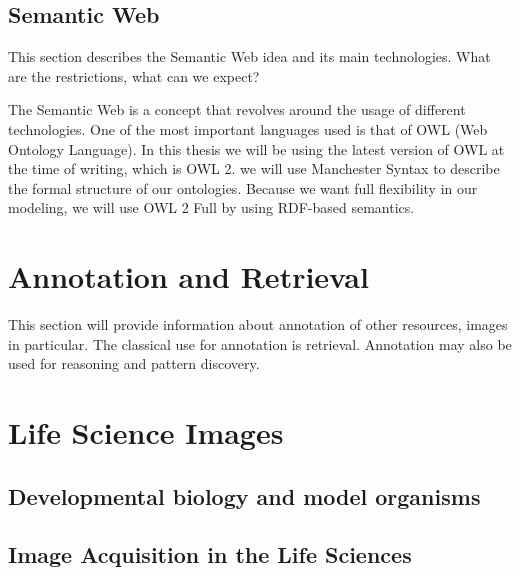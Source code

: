 
\subsection{Semantic Web}

This section describes the Semantic Web idea and
its main technologies. What are the restrictions, what can we expect?

The Semantic Web is a concept that revolves around the usage of
different technologies. One of the most important languages used is
that of OWL (Web Ontology Language). In this thesis we will
be using the latest version of OWL at the time of writing, which is
OWL 2. we will use Manchester Syntax to
describe the formal structure of our
ontologies. Because we want full flexibility in our
modeling, we will use OWL 2 Full by using RDF-based
semantics.




\section{Annotation and Retrieval}

This section will provide information about
annotation of other resources, images in
particular. The classical use for annotation is
retrieval. Annotation may also be used for
reasoning and pattern discovery.


\section{Life Science Images}



\subsection{Developmental biology and model organisms}



\subsection{Image Acquisition in the Life Sciences}


